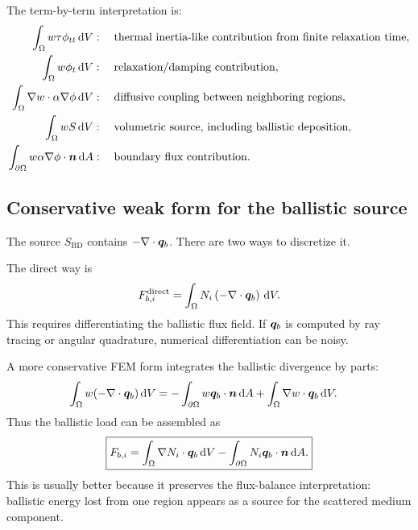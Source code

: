 \documentclass[11pt]{article}
\begin{document}
The term-by-term interpretation is:
\begin{align}
    \int_\Omega w\tau\phi_{tt}\,\dd V
    &:\quad \text{thermal inertia-like contribution from finite relaxation time},\\
    \int_\Omega w\phi_t\,\dd V
    &:\quad \text{relaxation/damping contribution},\\
    \int_\Omega \nabla w\cdot\alpha\nabla\phi\,\dd V
    &:\quad \text{diffusive coupling between neighboring regions},\\
    \int_\Omega wS\,\dd V
    &:\quad \text{volumetric source, including ballistic deposition},\\
    \int_{\partial\Omega} w\alpha\nabla\phi\cdot\bm{n}\,\dd A
    &:\quad \text{boundary flux contribution}.
\end{align}

\subsection{Conservative weak form for the ballistic source}
The source \(S_{\mathrm{BD}}\) contains \(-\nabla\cdot\bm{q}_b\). There are two ways to discretize it.

The direct way is
\begin{equation}
    F_{b,i}^{\mathrm{direct}}
    =\int_\Omega N_i\left(-\nabla\cdot\bm{q}_b\right)\,\dd V.
    \label{eq:direct_ballistic_load}
\end{equation}
This requires differentiating the ballistic flux field. If \(\bm{q}_b\) is computed by ray tracing or angular quadrature, numerical differentiation can be noisy.

A more conservative FEM form integrates the ballistic divergence by parts:
\begin{align}
    \int_\Omega w(-\nabla\cdot\bm{q}_b)\,\dd V
    &=-\int_{\partial\Omega} w\bm{q}_b\cdot\bm{n}\,\dd A
    +\int_\Omega \nabla w\cdot\bm{q}_b\,\dd V.
    \label{eq:ballistic_source_by_parts}
\end{align}
Thus the ballistic load can be assembled as
\begin{equation}
    \boxed{
    F_{b,i}
    =\int_\Omega \nabla N_i\cdot\bm{q}_b\,\dd V
    -\int_{\partial\Omega} N_i\bm{q}_b\cdot\bm{n}\,\dd A.}
    \label{eq:conservative_ballistic_load}
\end{equation}
This is usually better because it preserves the flux-balance interpretation: ballistic energy lost from one region appears as a source for the scattered medium component.
\end{document}
